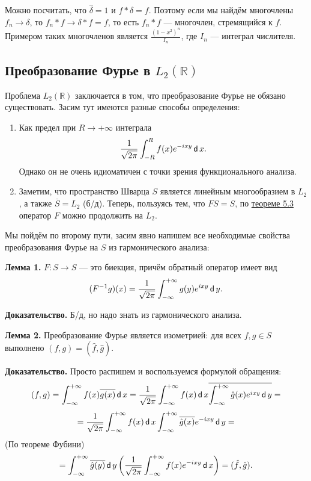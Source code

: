 Можно посчитать, что $\hat \delta = 1$ и $f * \delta = f$.
Поэтому если мы найдём многочлены $f_n \to \delta$, то $f_n * f \to \delta * f = f$, то есть $f_n * f$ --- многочлен, стремящийся к $f$.
Примером таких многочленов является $\frac{(1 - x^2)^n}{I_n}$, где $I_n$ --- интеграл числителя.

\subsection{Преобразование Фурье в $L_2(\mathbb R)$}
Проблема $L_2(\mathbb R)$ заключается в том, что преобразование Фурье не обязано существовать.
Засим тут имеются разные способы определения:
\begin{enumerate}
    \item Как предел при $R \to +\infty$ интеграла
        \[
            \frac{1}{\sqrt{2\pi}} \int_{-R}^R f(x) e^{-ixy} \operatorname{\mathsf d} x.
        \]
        Однако он не очень идиоматичен с точки зрения функционального анализа.

    \item Заметим, что пространство Шварца $S$ является линейным многообразием в $L_2$, а также $\overline S = L_2$ (б/д).
        Теперь, пользуясь тем, что $FS = S$, по \hyperref[th:5-3]{теореме 5.3} оператор $F$ можно продолжить на $L_2$.
\end{enumerate}

Мы пойдём по второму пути, засим явно напишем все необходимые свойства преобразования Фурье на $S$ из гармонического анализа:

\textbf{Лемма 1.} $F: S \to S$ --- это биекция, причём обратный оператор имеет вид
\[
    (F^{-1} g)(x) = \frac{1}{\sqrt{2\pi}} \int_{-\infty}^{+\infty} g(y) e^{ixy} \operatorname{\mathsf d} y.
\]

\textbf{Доказательство.} Б/д, но надо знать из гармонического анализа.

\QED

\textbf{Лемма 2.} Преобразование Фурье является изометрией: для всех $f, g \in S$ выполнено $(f, g) = (\hat f, \hat g)$.

\textbf{Доказательство.} Просто распишем и воспользуемся формулой обращения:
\[
    (f, g) = \int_{-\infty}^{+\infty} f(x) \overline{g(x)} \operatorname{\mathsf d} x = \frac{1}{\sqrt{2\pi}} \int_{-\infty}^{+\infty} f(x) \operatorname{\mathsf d} x \overline{\int_{-\infty}^{+\infty} \hat g(x) e^{ixy} \operatorname{\mathsf d} y} =
\]
\[
    = \frac{1}{\sqrt{2\pi}} \int_{-\infty}^{+\infty} f(x) \operatorname{\mathsf d} x \int_{-\infty}^{+\infty} \overline{\hat g(x)} e^{-ixy} \operatorname{\mathsf d} y =
\]
(По теореме Фубини)
\[
    = \int_{-\infty}^{+\infty} \overline{\hat g(y)} \operatorname{\mathsf d} y \left( \frac{1}{\sqrt{2\pi}} \int_{-\infty}^{+\infty} f(x) e^{-ixy} \operatorname{\mathsf d} x \right) = (\hat f, \hat g).
\]


